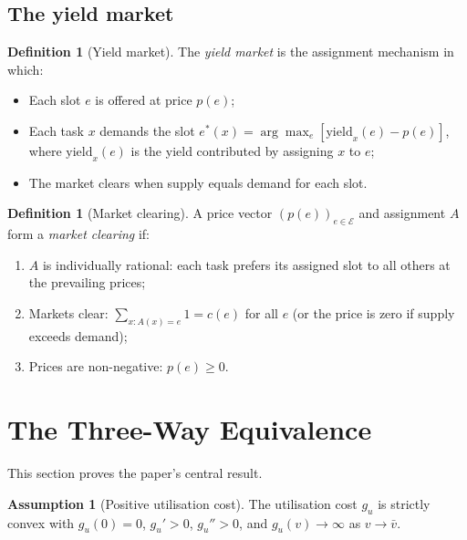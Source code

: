 \documentclass[11pt,twocolumn,a4paper]{article}
\theoremstyle{plain}
\theoremstyle{definition}
\newtheorem{definition}[theorem]{Definition}
\newtheorem{assumption}[theorem]{Assumption}
\theoremstyle{remark}
\newcommand{\E}{\mathcal{E}}
\newcommand{\yield}{\mathrm{yield}}
\begin{document}
\subsection{The yield market}

\begin{definition}[Yield market]
\label{def:market}
The \emph{yield market} is the assignment mechanism in which:
\begin{itemize}[nosep]
\item Each slot $e$ is offered at price $p(e)$;
\item Each task $x$ demands the slot $e^*(x) = \arg\max_{e} [\yield_x(e) - p(e)]$, where $\yield_x(e)$ is the yield contributed by assigning $x$ to $e$;
\item The market clears when supply equals demand for each slot.
\end{itemize}
\end{definition}

\begin{definition}[Market clearing]
\label{def:clearing}
A price vector $(p(e))_{e \in \E}$ and assignment $A$ form a \emph{market clearing} if:
\begin{enumerate}[nosep]
\item $A$ is individually rational: each task prefers its assigned slot to all others at the prevailing prices;
\item Markets clear: $\sum_{x: A(x)=e} 1 = c(e)$ for all $e$ (or the price is zero if supply exceeds demand);
\item Prices are non-negative: $p(e) \geq 0$.
\end{enumerate}
\end{definition}

\section{The Three-Way Equivalence}
\label{sec:equivalence}

This section proves the paper's central result.

\begin{assumption}[Positive utilisation cost]
\label{ass:cost}
The utilisation cost $g_u$ is strictly convex with $g_u(0) = 0$, $g_u' > 0$, $g_u'' > 0$, and $g_u(v) \to \infty$ as $v \to \bar{v}$.
\end{assumption}
\end{document}
